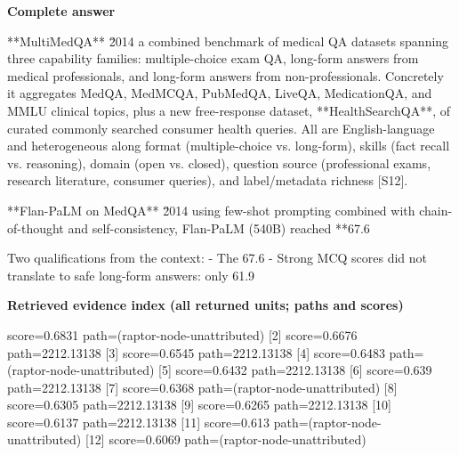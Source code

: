 \documentclass[10pt]{article}
\begin{document}
\textbf{Complete answer}
\begin{AnswerText}
**MultiMedQA** \u2014 a combined benchmark of medical QA datasets spanning three capability families: multiple-choice exam QA, long-form answers from medical professionals, and long-form answers from non-professionals. Concretely it aggregates MedQA, MedMCQA, PubMedQA, LiveQA, MedicationQA, and MMLU clinical topics, plus a new free-response dataset, **HealthSearchQA**, of curated commonly searched consumer health queries. All are English-language and heterogeneous along format (multiple-choice vs. long-form), skills (fact recall vs. reasoning), domain (open vs. closed), question source (professional exams, research literature, consumer queries), and label/metadata richness [S12].

**Flan-PaLM on MedQA** \u2014 using few-shot prompting combined with chain-of-thought and self-consistency, Flan-PaLM (540B) reached **67.6%

Two qualifications from the context:
- The 67.6%
- Strong MCQ scores did not translate to safe long-form answers: only 61.9%
\end{AnswerText}

\textbf{Retrieved evidence index (all returned units; paths and scores) }
\begin{EvidenceText}
[1] score=0.6831 path=(raptor-node-unattributed)
[2] score=0.6676 path=2212.13138
[3] score=0.6545 path=2212.13138
[4] score=0.6483 path=(raptor-node-unattributed)
[5] score=0.6432 path=2212.13138
[6] score=0.639 path=2212.13138
[7] score=0.6368 path=(raptor-node-unattributed)
[8] score=0.6305 path=2212.13138
[9] score=0.6265 path=2212.13138
[10] score=0.6137 path=2212.13138
[11] score=0.613 path=(raptor-node-unattributed)
[12] score=0.6069 path=(raptor-node-unattributed)
\end{EvidenceText}
\end{document}
